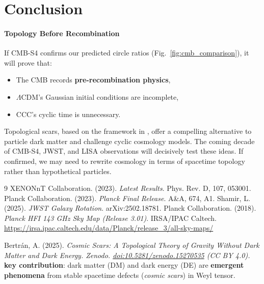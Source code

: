 \documentclass{article}
\begin{document}
\section{Conclusion}

\paragraph{Topology Before Recombination}  
If CMB-S4 confirms our predicted circle ratios (Fig.~\ref{fig:cmb_comparison}), it will prove that:  
\begin{itemize}  
    \item The CMB records \textbf{pre-recombination physics},  
    \item $\Lambda$CDM's Gaussian initial conditions are incomplete,  
    \item CCC's cyclic time is unnecessary.  
\end{itemize}  

Topological scars, based on the framework in \cite{bertran2025cosmic}, offer a compelling alternative to particle dark matter and challenge cyclic cosmology models. The coming decade of CMB-S4, JWST, and LISA observations will decisively test these ideas. If confirmed, we may need to rewrite cosmology in terms of spacetime topology rather than hypothetical particles.



\begin{thebibliography}{9}
 XENONnT Collaboration. (2023). \emph{Latest Results}. Phys. Rev. D, 107, 053001.
 Planck Collaboration. (2023). \textit{Planck Final Release}. A\&A, 674, A1.
 Shamir, L. (2025). \textit{JWST Galaxy Rotation}. arXiv:2502.18781.
 Planck Collaboration. (2018). \textit{Planck HFI 143 GHz Sky Map (Release 3.01)}. IRSA/IPAC Caltech. \url{https://irsa.ipac.caltech.edu/data/Planck/release_3/all-sky-maps/}

 Bertrán, A. (2025). \emph{Cosmic Scars: A Topological Theory of Gravity Without Dark Matter and Dark Energy. 
Zenodo. \href{https://doi.org/10.5281/zenodo.15270535}{doi:10.5281/zenodo.15270535} (CC BY 4.0).} \\ 
\textbf{key contribution}: dark matter (DM) and dark energy (DE) are \textbf{emergent phenomena} from stable spacetime defects (\textit{cosmic scars}) in Weyl tensor.



\end{thebibliography}
\end{document}

